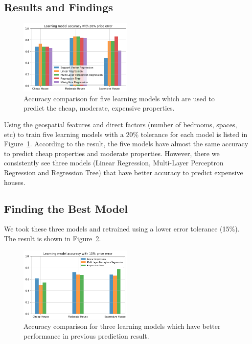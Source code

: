 \documentclass[11pt,a4paper]{article}
\begin{document}
\subsection{Results and Findings}

\begin{figure}[h]
\includegraphics[width=0.5\textwidth]{result-data/tolerance20.png}
\caption{Accuracy comparison for five learning models which are used to predict the cheap, moderate, expensive properties.}
\label{fig:tolerance20}
\centering
\end{figure}
Using the geospatial features and direct factors (number of bedrooms, spaces, etc) to train five learning models with a 20\% tolerance for each model is listed in Figure~\ref{fig:tolerance20}. According to the result, the five models have almost the same accuracy to predict cheap properties and moderate properties. However, there we consistently see three models (Linear Regression, Multi-Layer Perceptron Regression and Regression Tree) that have better accuracy to predict expensive houses. 

\subsection{Finding the Best Model}
We took these three models and retrained using a lower error tolerance (15\%). The result is shown in Figure~\ref{fig:tolerance15}. 
\begin{figure}[h]
\includegraphics[width=0.5\textwidth]{result-data/tolerance15.png}
\caption{Accuracy comparison for three learning models which have better performance in previous prediction result.}
\label{fig:tolerance15}
\centering
\end{figure}
\end{document}
